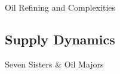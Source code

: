 \documentclass[10pt]{article}
\begin{document}
    \begin{core}{Oil Refining and Complexities}


    \end{core}

  \subsection{Supply Dynamics}

    \begin{core}{Seven Sisters \& Oil Majors}


    \end{core}
\end{document}
